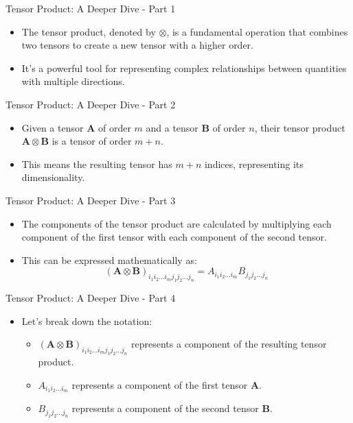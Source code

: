 \documentclass{beamer}
\begin{document}
\begin{frame}{Tensor Product: A Deeper Dive - Part 1}
    \begin{itemize}
        \item The tensor product, denoted by $\otimes$, is a fundamental operation that combines two tensors to create a new tensor with a higher order.
        \item It's a powerful tool for representing complex relationships between quantities with multiple directions.
    \end{itemize}
\end{frame}

\begin{frame}{Tensor Product: A Deeper Dive - Part 2}
    \begin{itemize}
        \item Given a tensor $\mathbf{A}$ of order $m$ and a tensor $\mathbf{B}$ of order $n$, their tensor product $\mathbf{A} \otimes \mathbf{B}$ is a tensor of order $m + n$.
        \item This means the resulting tensor has $m + n$ indices, representing its dimensionality.
    \end{itemize}
\end{frame}

\begin{frame}{Tensor Product: A Deeper Dive - Part 3}
    \begin{itemize}
        \item The components of the tensor product are calculated by multiplying each component of the first tensor with each component of the second tensor.
        \item This can be expressed mathematically as:
        \begin{equation*}
        (\mathbf{A} \otimes \mathbf{B})_{i_1 i_2... i_m j_1 j_2... j_n} = A_{i_1 i_2... i_m} B_{j_1 j_2... j_n}
        \end{equation*}
    \end{itemize}
\end{frame}

\begin{frame}{Tensor Product: A Deeper Dive - Part 4}
    \begin{itemize}
        \item Let's break down the notation:
        \begin{itemize}
            \item $(\mathbf{A} \otimes \mathbf{B})_{i_1 i_2... i_m j_1 j_2... j_n}$ represents a component of the resulting tensor product.
            \item $A_{i_1 i_2... i_m}$ represents a component of the first tensor $\mathbf{A}$.
            \item $B_{j_1 j_2... j_n}$ represents a component of the second tensor $\mathbf{B}$.
        \end{itemize}
    \end{itemize}
\end{frame}
\end{document}
